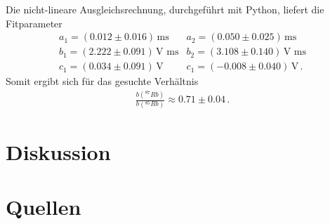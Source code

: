 \documentclass[]{scrartcl}
\begin{document}
Die nicht-lineare Ausgleichsrechnung, durchgeführt mit Python, liefert die Fitparameter
\begin{align*}
a_1=(0.012 \pm 0.016)\,\text{ms} & a_2=(0.050 \pm 0.025)\,\text{ms} \\
b_1=(2.222 \pm 0.091)\, \text{V ms} & b_2=(3.108 \pm 0.140)\, \text{V ms} \\
c_1=(0.034 \pm 0.091)\, \text{V} & c_1=(-0.008 \pm 0.040)\, \text{V}\,.
\end{align*}
Somit ergibt sich für das gesuchte Verhältnis
\begin{align*}
\frac{b(^{87}Rb)}{b(^{85}Rb)}\approx 0.71 \pm 0.04\,.
\end{align*}
\section{Diskussion}

\section{Quellen}
\end{document}
